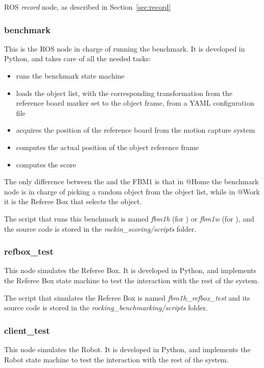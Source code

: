 \documentclass[a4paper]{article}
\begin{document}
ROS \emph{record} node, as described in Section~\ref{sec:record}

\subsubsection{benchmark}

This is the ROS node in charge of running the benchmark.
It is developed in Python, and takes care of all the needed tasks:

\begin{itemize}
  \item runs the benchmark state machine
  \item loads the object list, with the corresponding transformation from the reference board marker set to the object frame, from a YAML configuration file
  \item acquires the position of the reference board from the motion capture system
  \item computes the actual position of the object reference frame
  \item computes the score
\end{itemize}

The only difference between the \ro@Home and the \ro@Work FBM1 is that in @Home the benchmark node is in charge of picking a random object from the object list, while in @Work it is the Referee Box that selects the object.

The script that runs this benchmark is named \emph{fbm1h} (for \ro@Home) or \emph{fbm1w} (for \ro@Work), and the source code is stored in the \emph{rockin\_scoring/scripts} folder.


\subsubsection{refbox\_test}

This node simulates the Referee Box.
It is developed in Python, and implements the Referee Box state machine to test the interaction with the rest of the system.

The script that simulates the Referee Box is named \emph{fbm1h\_refbox\_test} and its source code is stored in the \emph{rocking\_benchmarking/scripts} folder.

\subsubsection{client\_test}

This node simulates the Robot.
It is developed in Python, and implements the Robot state machine to test the interaction with the rest of the system.
\end{document}
